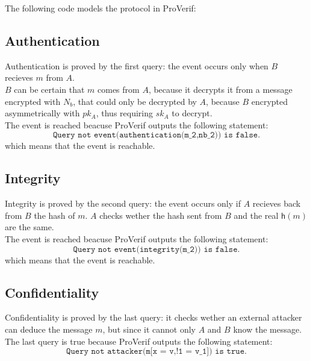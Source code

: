 The following code models the protocol in ProVerif:

\texttt{}

\subsection{Authentication}
Authentication is proved by the first query: the event occurs only when $B$ recieves $m$ from $A$. \\
$B$ can be certain that $m$ comes from $A$, because it decrypts it from a message encrypted with $N_b$, that could only be decrypted by $A$, because $B$ encrypted asymmetrically with $pk_A$, thus requiring $sk_A$ to decrypt. \\
The event is reached beacuse ProVerif outputs the following statement:
$$
\texttt{Query not event(authentication(m\_2,nb\_2)) is false.}
$$
which means that the event is reachable.

\subsection{Integrity}
Integrity is proved by the second query: the event occurs only if $A$ recieves back from $B$ the hash of $m$. $A$ checks wether the hash sent from $B$ and the real $\mathsf{h}(m)$ are the same. \\
The event is reached beacuse ProVerif outputs the following statement:
$$
\texttt{Query not event(integrity(m\_2)) is false.}
$$
which means that the event is reachable.

\subsection{Confidentiality}
Confidentiality is proved by the last query: it checks wether an external attacker can deduce the message $m$, but since it cannot only $A$ and $B$ know the message. \\
The last query is true because ProVerif outputs the following statement:
$$
\texttt{Query not attacker(m[x = v,!1 = v_1]) is true.}
$$

